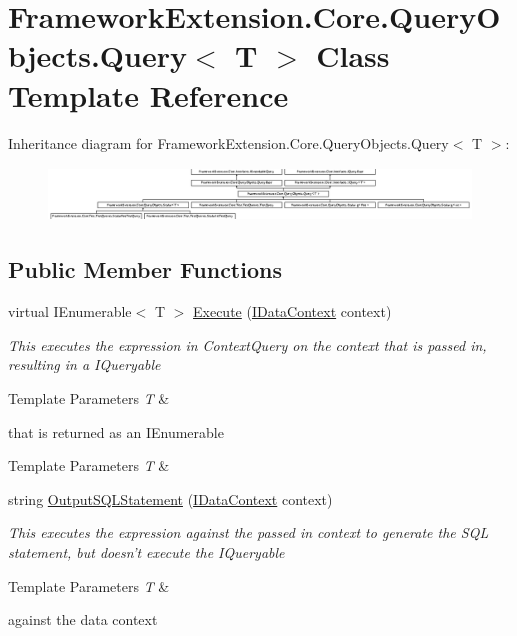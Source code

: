 \hypertarget{class_framework_extension_1_1_core_1_1_query_objects_1_1_query-g}{\section{Framework\-Extension.\-Core.\-Query\-Objects.\-Query$<$ T $>$ Class Template Reference}
\label{class_framework_extension_1_1_core_1_1_query_objects_1_1_query-g}
}
Inheritance diagram for Framework\-Extension.\-Core.\-Query\-Objects.\-Query$<$ T $>$\-:\begin{figure}[H]
\begin{center}
\leavevmode
\includegraphics[height=1.435897cm]{class_framework_extension_1_1_core_1_1_query_objects_1_1_query-g}
\end{center}
\end{figure}
\subsection*{Public Member Functions}
\begin{DoxyCompactItemize}
\item 
virtual I\-Enumerable$<$ T $>$ \hyperlink{class_framework_extension_1_1_core_1_1_query_objects_1_1_query-g_a492abefd04cb45983c1ac76c4ae4acb7}{Execute} (\hyperlink{interface_framework_extension_1_1_core_1_1_interfaces_1_1_i_data_context}{I\-Data\-Context} context)
\begin{DoxyCompactList}\small\item\em This executes the expression in Context\-Query on the context that is passed in, resulting in a I\-Queryable
\begin{DoxyTemplParams}{Template Parameters}
{\em T} & \\
\hline
\end{DoxyTemplParams}
that is returned as an I\-Enumerable
\begin{DoxyTemplParams}{Template Parameters}
{\em T} & \\
\hline
\end{DoxyTemplParams}
\end{DoxyCompactList}\item 
string \hyperlink{class_framework_extension_1_1_core_1_1_query_objects_1_1_query-g_af5d93ae2f7a467a48500683857b842d2}{Output\-S\-Q\-L\-Statement} (\hyperlink{interface_framework_extension_1_1_core_1_1_interfaces_1_1_i_data_context}{I\-Data\-Context} context)
\begin{DoxyCompactList}\small\item\em This executes the expression against the passed in context to generate the S\-Q\-L statement, but doesn't execute the I\-Queryable
\begin{DoxyTemplParams}{Template Parameters}
{\em T} & \\
\hline
\end{DoxyTemplParams}
against the data context \end{DoxyCompactList}\end{DoxyCompactItemize}
